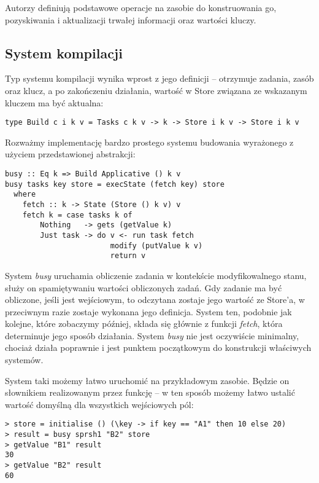 Autorzy definiują podstawowe operacje na zasobie do konstruowania go, pozyskiwania i aktualizacji trwałej informacji oraz wartości kluczy.

\subsection{System kompilacji}

Typ systemu kompilacji wynika wprost z jego definicji -- otrzymuje zadania, zasób oraz klucz, a po zakończeniu działania, wartość w Store związana ze wskazanym kluczem ma być aktualna:

\begin{lstlisting}
type Build c i k v = Tasks c k v -> k -> Store i k v -> Store i k v
\end{lstlisting}

Rozważmy implementację bardzo prostego systemu budowania wyrażonego z użyciem przedstawionej abstrakcji:

\begin{lstlisting}
busy :: Eq k => Build Applicative () k v
busy tasks key store = execState (fetch key) store
  where
    fetch :: k -> State (Store () k v) v
    fetch k = case tasks k of
        Nothing   -> gets (getValue k)
        Just task -> do v <- run task fetch
                        modify (putValue k v)
                        return v
\end{lstlisting}

System \textit{busy} uruchamia obliczenie zadania w kontekście modyfikowalnego stanu, służy on spamiętywaniu wartości obliczonych zadań. Gdy zadanie ma być obliczone, jeśli jest wejściowym, to odczytana zostaje jego wartość ze Store'a, w przeciwnym razie zostaje wykonana jego definicja. System ten, podobnie jak kolejne, które zobaczymy później, składa się głównie z funkcji \textit{fetch}, która determinuje jego sposób działania. System \textit{busy} nie jest oczywiście minimalny, chociaż działa poprawnie i jest punktem początkowym do konstrukcji właściwych systemów.

System taki możemy łatwo uruchomić na przykładowym zasobie. Będzie on słownikiem realizowanym przez funkcję -- w ten sposób możemy łatwo ustalić wartość domyślną dla wszystkich wejściowych pól:

\begin{lstlisting}
> store = initialise () (\key -> if key == "A1" then 10 else 20)
> result = busy sprsh1 "B2" store
> getValue "B1" result
30
> getValue "B2" result
60
\end{lstlisting}

